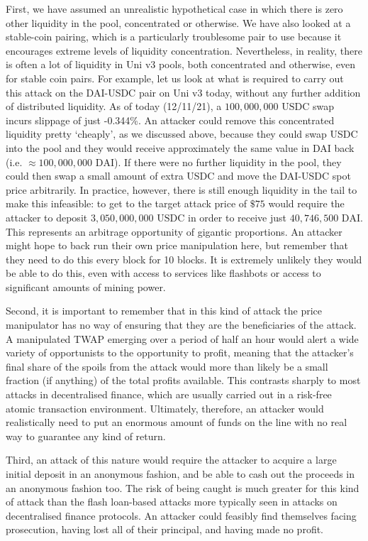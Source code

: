 \documentclass[a4paper, 11pt]{article}
\begin{document}
First, we have assumed an unrealistic hypothetical case in which there is zero other liquidity in the pool, concentrated or otherwise. We have also looked at a stable-coin pairing, which is a particularly troublesome pair to use because it encourages extreme levels of liquidity concentration. Nevertheless, in reality, there is often a lot of liquidity in Uni v3 pools, both concentrated and otherwise, even for stable coin pairs. For example, let us look at what is required to carry out this attack on the DAI-USDC pair on Uni v3 today, without any further addition of distributed liquidity. As of today (12/11/21), a $100,000,000 \text{ USDC}$ swap incurs slippage of just -0.344\%. An attacker could remove this concentrated liquidity pretty `cheaply', as we discussed above, because they could swap USDC into the pool and they would receive approximately the same value in DAI back (i.e. $\approx 100,000,000 \text{ DAI}$). If there were no further liquidity in the pool, they could then swap a small amount of extra USDC and move the DAI-USDC spot price arbitrarily. In practice, however, there is still enough liquidity in the tail to make this infeasible: to get to the target attack price of $\$75$ would require the attacker to deposit $3,050,000,000 \text{ USDC}$ in order to receive just $40,746,500 \text{ DAI}$. This represents an arbitrage opportunity of gigantic proportions. An attacker might hope to back run their own price manipulation here, but remember that they need to do this every block for 10 blocks. It is extremely unlikely they would be able to do this, even with access to services like flashbots or access to significant amounts of mining power. 

Second, it is important to remember that in this kind of attack the price manipulator has no way of ensuring that they are the beneficiaries of the attack. A manipulated TWAP emerging over a period of half an hour would alert a wide variety of opportunists to the opportunity to profit, meaning that the attacker's final share of the spoils from the attack would more than likely be a small fraction (if anything) of the total profits available. This contrasts sharply to most attacks in decentralised finance, which are usually carried out in a risk-free atomic transaction environment. Ultimately, therefore, an attacker would realistically need to put an enormous amount of funds on the line with no real way to guarantee any kind of return. 

Third, an attack of this nature would require the attacker to acquire a large initial deposit in an anonymous fashion, and be able to cash out the proceeds in an anonymous fashion too. The risk of being caught is much greater for this kind of attack than the flash loan-based attacks more typically seen in attacks on decentralised finance protocols. An attacker could feasibly find themselves facing prosecution, having lost all of their principal, and having made no profit.
\end{document}
